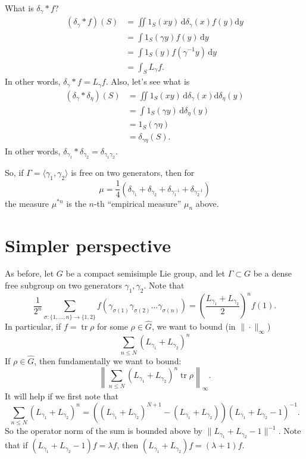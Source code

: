 \documentclass{article}
\DeclareMathOperator{\tr}{tr}
\newcommand{\dd}{\mathrm{d}}
\begin{document}
What is $\delta_\gamma\ast f$?
\begin{align*}
	(\delta_\gamma\ast f)(S) 
		&= \iint 1_S(x y) \, \dd \delta_\gamma(x) f(y)\dd y \\
		&= \int 1_S(\gamma y) f(y)\, \dd y \\
		&= \int 1_S(y) f(\gamma^{-1} y)\, \dd y \\
		&= \int_S L_\gamma f .
\end{align*}
In other words, $\delta_\gamma\ast f = L_\gamma f$. Also, let's see what is 
\begin{align*}
	(\delta_\gamma \ast \delta_\eta)(S) 
		&= \iint 1_S(x y)\, \dd \delta_\gamma(x) \dd \delta_\eta(y) \\
		&= \int 1_S(\gamma y)\, \dd \delta_\eta(y) \\
		&= 1_S(\gamma\eta) \\
		&= \delta_{\gamma\eta}(S) .
\end{align*}
In other words, 
$\delta_{\gamma_1} \ast \delta_{\gamma_2} = \delta_{\gamma_1 \gamma_2}$. 

So, if $\Gamma=\langle \gamma_1,\gamma_2\rangle$ is free on two generators, then 
for 
\[
	\mu = \frac 1 4 \left(\delta_{\gamma_1} + \delta_{\gamma_2} + \delta_{\gamma_1^{-1}} + \delta_{\gamma_2^{-1}}\right) 
\]
the measure $\mu^{\ast n}$ is the $n$-th ``empirical measure'' $\mu_n$ above. 





\section{Simpler perspective}

As before, let $G$ be a compact semisimple Lie group, and let 
$\Gamma\subset G$ be a dense free subgroup on two generators 
$\gamma_1,\gamma_2$. Note that 
\[
	\frac{1}{2^n} \sum_{\sigma\colon \{1,\dots,n\} \to \{1,2\}} f(\gamma_{\sigma(1)} \gamma_{\sigma(2)} \dots \gamma_{\sigma(n)}) = \left(\frac{L_{\gamma_1} + L_{\gamma_2}}{2}\right)^n f (1) .
\]
In particular, if $f = \tr\rho$ for some $\rho\in \widehat G$, we want to 
bound (in $\|\cdot\|_\infty$) 
\[
	\sum_{n\leqslant N} \left( L_{\gamma_1} + L_{\gamma_2}\right)^n
\]
If $\rho\in \widehat G$, then fundamentally we want to bound: 
\[
	\left\| \sum_{n\leqslant N} (L_{\gamma_1} + L_{\gamma_2})^n \tr \rho\right\|_\infty .
\]
It will help if we first note that 
\[
	\sum_{n\leqslant N} (L_{\gamma_1} + L_{\gamma_2})^n = ((L_{\gamma_1} + L_{\gamma_2})^{N+1} - (L_{\gamma_1} + L_{\gamma_2})) (L_{\gamma_1} + L_{\gamma_2} - 1)^{-1} .
\]
So the operator norm of the sum is bounded above by 
$\| L_{\gamma_1} + L_{\gamma_2} - 1\|^{-1}$. Note that if 
$(L_{\gamma_1} + L_{\gamma_2} - 1) f = \lambda f$, then 
$(L_{\gamma_1} + L_{\gamma_2})f = (\lambda + 1) f$. 
\end{document}
